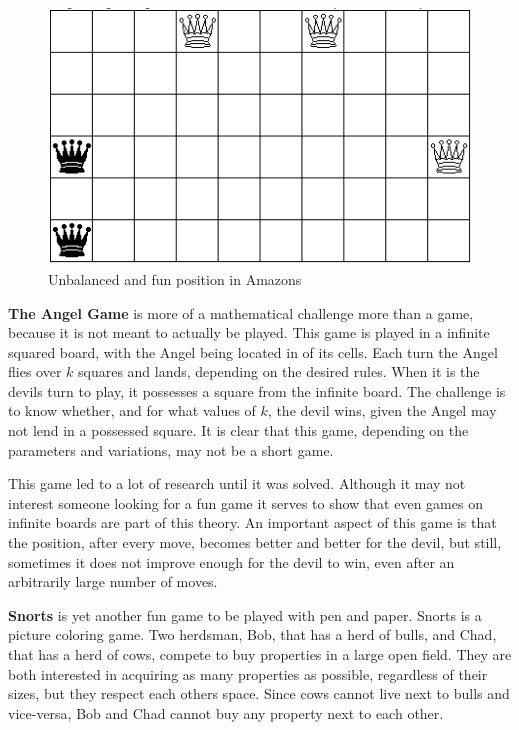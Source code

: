 \begin{figure} [H]
	\begin{center}
		\includegraphics[scale=0.5]{sections/examples/unbalanced_amazons.png}
	\end{center}
	\caption{Unbalanced and fun position in Amazons}
\end{figure}

\textbf{The Angel Game} is more of a mathematical challenge more than a game, because it is not meant to actually be played. This game is played in a infinite squared board, with the Angel being located in of its cells. Each turn the Angel flies over $k$ squares and lands, depending on the desired rules. When it is the devils turn to play, it possesses a square from the infinite board. The challenge is to know whether, and for what values of $k$, the devil wins, given the Angel may not lend in a possessed square. It is clear that this game, depending on the parameters and variations, may not be a short game.

This game led to a lot of research until it was solved. Although it may not interest someone looking for a fun game it serves to show that even games on infinite boards are part of this theory. An important aspect of this game is that the position, after every move, becomes better and better for the devil, but still, sometimes it does not improve enough for the devil to win, even after an arbitrarily large number of moves.

\textbf{Snorts} is yet another fun game to be played with pen and paper. Snorts is a picture coloring game. Two herdsman, Bob, that has a herd of bulls, and Chad, that has a herd of cows, compete to buy properties in a large open field. They are both interested in acquiring as many properties as possible, regardless of their sizes, but they respect each others space. Since cows cannot live next to bulls and vice-versa, Bob and Chad cannot buy any property next to each other.

